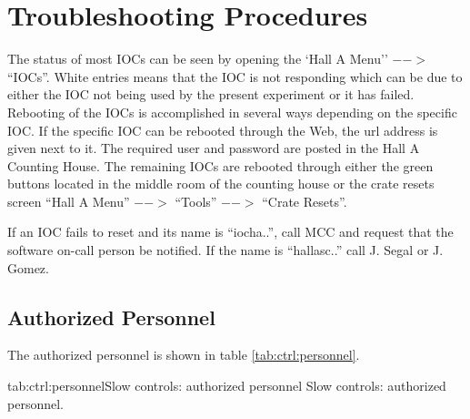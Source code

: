 {{\section{Troubleshooting Procedures}
The status of most IOCs can be seen
by opening the `Hall A Menu'' $-->$ ``IOCs''. White entries means that the IOC
is not responding which can be due to either the IOC not being used by the present
experiment or it has failed. Rebooting of the IOCs is accomplished in several ways
depending on the specific IOC. If the specific IOC can be rebooted through the
Web, the url address is given next to it. The required user and password are
posted in the Hall A Counting House. The remaining IOCs are rebooted through
either the green buttons located in the middle room of the counting house
or the crate resets screen ``Hall A Menu'' $-->$ ``Tools'' $-->$ ``Crate Resets''.

If an IOC fails to reset and its name is ``iocha..'', call MCC and request that
the software on-call person be notified. If the name is ``hallasc..'' call J. Segal or J. Gomez.

} %

\infolevltone{\newpage}
\begin{safetyen}{10}{15}
\subsection{Authorized  Personnel} 
\end{safetyen}
The authorized personnel is shown in table \ref{tab:ctrl:personnel}.
\begin{namestab}{tab:ctrl:personnel}{Slow controls: authorized personnel}{%
      Slow controls: authorized personnel.}
  \JackSegal{}
  \JavierGomez{}
\end{namestab}

}

